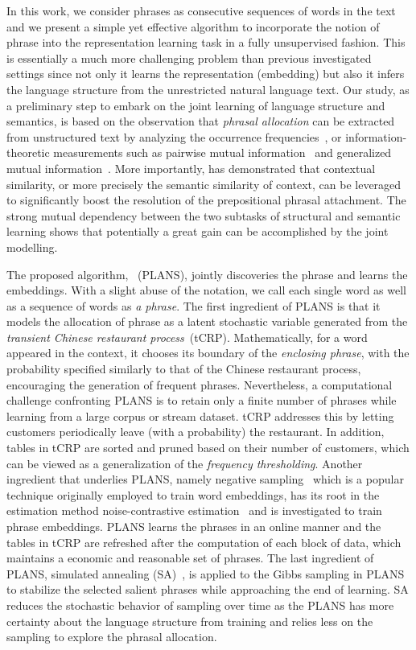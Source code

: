 In this work, we consider phrases as consecutive sequences of words in the text
and we present a simple yet effective algorithm to incorporate the notion of
phrase into the representation learning task in a fully unsupervised fashion.
This is essentially a much more challenging problem than previous investigated
settings since not only it learns the representation (embedding) but also it
infers the language structure from the unrestricted natural language text. Our
study, as a preliminary step to embark on the joint learning of language
structure and semantics, is based on the observation that \emph{phrasal
allocation} can be extracted from unstructured text by analyzing the occurrence
frequencies~\cite{witten1999kea,lindsey2012phrase,wang2007topical}, or
information-theoretic measurements such as pairwise mutual
information~\cite{fano1961transmission,church1990word} and generalized mutual
information~\cite{magerman1990parsing}. More importantly,
\cite{pantel2000unsupervised,collins1995prepositional} has demonstrated that
contextual similarity, or more precisely the semantic similarity of context, can
be leveraged to significantly boost the resolution of the prepositional phrasal
attachment. The strong mutual dependency between the two subtasks of structural
and semantic learning shows that potentially a great gain can be accomplished by
the joint modelling.

The proposed algorithm, \PLANS~(PLANS), jointly discoveries the phrase and
learns the embeddings. With a slight abuse of the notation, we call each single
word as well as a sequence of words as \emph{a phrase}. The first ingredient of
PLANS is that it models the allocation of phrase as a latent stochastic variable
generated from the \emph{transient Chinese restaurant process}~(tCRP).
Mathematically, for a word appeared in the context, it chooses its boundary of
the \emph{enclosing phrase}, with the probability specified similarly to that of
the Chinese restaurant process, encouraging the generation of frequent phrases.
Nevertheless, a computational challenge confronting PLANS is to retain only a
finite number of phrases while learning from a large corpus or stream dataset.
tCRP addresses this by letting customers periodically leave (with a probability)
the restaurant. In addition, tables in tCRP are sorted and pruned based on their
number of customers, which can be viewed as a generalization of the
\emph{frequency thresholding}. Another ingredient that underlies PLANS, namely
negative sampling~\cite{mikolov2013efficient} which is a popular technique
originally employed to train word embeddings, has its root in the estimation
method noise-contrastive estimation~\cite{gutmann2010noise} and is investigated
to train phrase embeddings. PLANS learns the phrases in an online manner and the
tables in tCRP are refreshed after the computation of each block of data, which
maintains a economic and reasonable set of phrases. The last ingredient of
PLANS, simulated annealing
(SA)~\cite{aarts1988simulated,brooks1995optimization}, is applied to the Gibbs
sampling in PLANS to stabilize the selected salient phrases while approaching
the end of learning. SA reduces the stochastic behavior of sampling over time as
the PLANS has more certainty about the language structure from training and
relies less on the sampling to explore the phrasal allocation.
